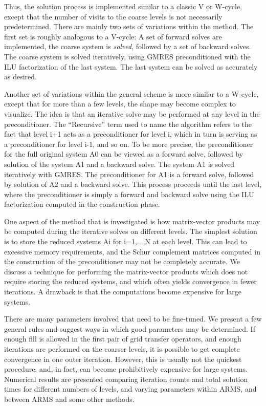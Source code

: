 \documentclass[11pt]{article}
\begin{document}
Thus, the solution process  is implemented similar  to a classic V  or
W-cycle, except that the number of visits to the  coarse levels is not
necessarily predetermined.   There are mainly  two sets  of variations
within the method.  The first set is roughly analogous to a V-cycle: A
set of  forward  solves are implemented,  the   coarse system is
{\em solved}, followed by  a set of  backward solves.  The coarse system is
solved  iteratively,   using  GMRES   preconditioned  with    the  ILU
factorization of the last  system.  The last  system can be solved  as
accurately as desired.

Another set of variations within the general scheme is more similar to
a W-cycle, except that for more than a few levels, the shape may
become complex to visualize.
The idea is that an iterative solve may be performed at any level in
the preconditioner.  The ``Recursive'' term used to name the algorithm
refers to the fact that
level i+1 acts as a preconditioner for level i, which in
turn is serving as a preconditioner for level i-1, and so on.
To be more precise, the preconditioner for the full original system
A0
can be viewed as a forward solve, followed by solution of the system A1
and a backward solve.  The system A1 is solved iteratively with GMRES.
The preconditioner for A1 is a forward
solve, followed by solution of A2 and a backward solve.  This process
proceeds until the last level, where the preconditioner is simply a forward
and backward solve using the ILU factorization computed in the construction
phase.

One aspect of  the method that is   investigated is how  matrix-vector
products  may be  computed during  the  iterative  solves on different
levels.  The simplest solution is to store the reduced systems Ai
for i=1,...,N  at each level.    This  can lead  to excessive   memory
requirements, and the    Schur  complement matrices  computed  in  the
construction of the preconditioner may not be completely accurate.  We
discuss  a technique for  performing  the matrix-vector products which
does not  require storing the  reduced systems, and which often yields
convergence in fewer iterations.  A drawback  is that the computations
become expensive for large systems.

There are many parameters involved that need to be fine-tuned.  We
present a few general rules and suggest ways  in which good parameters
may  be determined.  If enough  fill is allowed   in the first pair of
grid transfer  operators, and enough iterations   are performed on the
coarser levels, it  is possible  to get  complete convergence in   one
outer iteration.  However, this is usually not the quickest procedure,
and,  in fact, can  become  prohibitively expensive for large systems.
Numerical results are presented  comparing iteration counts  and total
solution times for different numbers of levels, and varying parameters
within ARMS, and between ARMS and some other methods.
\end{document}
